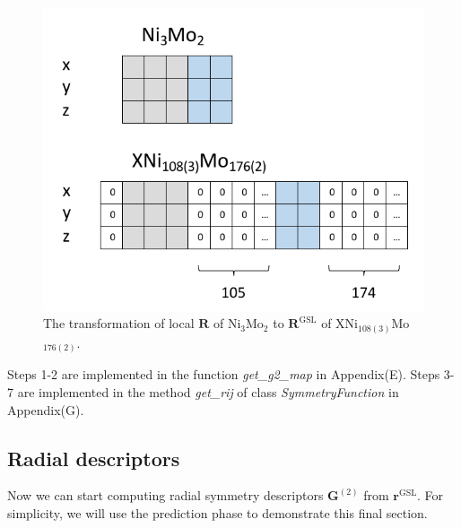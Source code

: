 \documentclass[preprint]{revtex4-2}
\begin{document}
% 
%
\begin{figure}[h!]
\centering
\includegraphics[scale=0.8]{figures/Fig3si.pdf}
\caption{\label{fig:Fig3si} The transformation of local $\mathbf{R}$ of 
Ni$_3$Mo$_2$ to $\mathbf{R}^{\mathrm{GSL}}$ of XNi$_{108(3)}$Mo$_{176(2)}$.
}
\end{figure}

Steps 1-2 are implemented in the function \textit{get\_g2\_map} in Appendix(E).
Steps 3-7 are implemented in the method \textit{get\_rij} of class 
\textit{SymmetryFunction} in Appendix(G). 

% 
%
\subsection{Radial descriptors}
\label{section:radial_descriptors}

Now we can start computing radial symmetry descriptors 
$\mathbf{G}^{(2)}$ from $\mathbf{r}^{\mathrm{GSL}}$. For simplicity, we will use 
the prediction phase to demonstrate this final section. 
\end{document}
